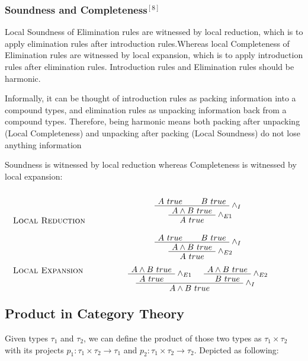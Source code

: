 \documentclass{article}
\begin{document}
\subsubsection*{Soundness and Completeness$^{[8]}$}
Local Soundness of Elimination rules are witnessed by local reduction, which is to apply elimination rules after introduction rules.Whereas local Completeness of Elimination rules are witnessed by local expansion, which is to apply introduction rules after elimination rules. Introduction rules and Elimination rules should be harmonic.


Informally, it can be thought of introduction rules as packing information into a compound types, and elimination rules as unpacking information back from a compound types. Therefore, being harmonic means both packing after unpacking (Local Completeness) and unpacking after packing (Local Soundness) do not lose anything information


Soundness is witnessed by local reduction whereas Completeness is witnessed by local expansion:
\[
\begin{tabular}{@{} l >{\centering\arraybackslash}m{.7\textwidth} @{}}
\textsc{Local Reduction} &
  \begin{prooftree}
  \AxiomC{$A\ true$}
  \AxiomC{$B\ true$}
  \RightLabel{$\wedge_{I}$}
  \BinaryInfC{$A\wedge B\ true$}
  \RightLabel{$\wedge_{E1}$}
  \UnaryInfC{$A\ true$}
  \end{prooftree}
  \begin{prooftree}
  \AxiomC{$A\ true$}
  \AxiomC{$B\ true$}
  \RightLabel{$\wedge_{I}$}
  \BinaryInfC{$A\wedge B\ true$}
  \RightLabel{$\wedge_{E2}$}
  \UnaryInfC{$A\ true$}
  \end{prooftree}
\\
\textsc{Local Expansion} &
  \begin{prooftree}
  \AxiomC{$A\wedge B\ true$}
  \RightLabel{$\wedge_{E1}$}
  \UnaryInfC{$A\ true$}
  \AxiomC{$A\wedge B\ true$}
  \RightLabel{$\wedge_{E2}$}
  \UnaryInfC{$B\ true$}
  \RightLabel{$\wedge_{I}$}
  \BinaryInfC{$A\wedge B\ true$}
  \end{prooftree}
\end{tabular}
\]

\subsection*{Product in Category Theory}
Given types $\tau_{1}$ and $\tau_{2}$, we can define the product of those two types as $\tau_{1}\times\tau_{2}$ with its projects $p_{1} : \tau_{1}\times\tau_{2} \rightarrow \tau_{1}$ and $p_{2} : \tau_{1}\times\tau_{2} \rightarrow \tau_{2}$. Depicted as following:
\end{document}
